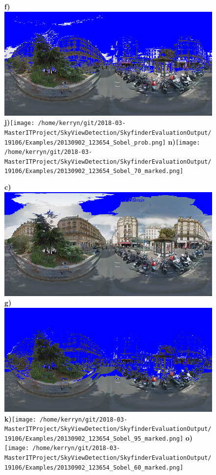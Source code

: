 \documentclass{article}
\begin{document}
\begin{figure}
\textbf{\scriptsize{f)}}\includegraphics[scale=0.13]{Images/2/panorama-JtVHmEl7WCiz1xJ0bcJpBg-1_Sobel_70_marked.png}%
\textbf{\scriptsize{j)}}\texttt{[image: /home/kerryn/git/2018-03-MasterITProject/SkyViewDetection/SkyfinderEvaluationOutput/19106/Examples/20130902\_123654\_Sobel\_prob.png]} %
\textbf{\scriptsize{n)}}\texttt{[image: /home/kerryn/git/2018-03-MasterITProject/SkyViewDetection/SkyfinderEvaluationOutput/19106/Examples/20130902\_123654\_Sobel\_70\_marked.png]} 

\textbf{\scriptsize{c)}}\includegraphics[scale=0.13]{Images/2/panorama-JtVHmEl7WCiz1xJ0bcJpBg-1_Sobel_95_marked.png} %
\textbf{\scriptsize{g)}}\includegraphics[scale=0.13]{Images/2/panorama-JtVHmEl7WCiz1xJ0bcJpBg-1_Sobel_60_marked.png}%
\textbf{\scriptsize{k)}}\texttt{[image: /home/kerryn/git/2018-03-MasterITProject/SkyViewDetection/SkyfinderEvaluationOutput/19106/Examples/20130902\_123654\_Sobel\_95\_marked.png]} %
\textbf{\scriptsize{o)}}\texttt{[image: /home/kerryn/git/2018-03-MasterITProject/SkyViewDetection/SkyfinderEvaluationOutput/19106/Examples/20130902\_123654\_Sobel\_60\_marked.png]} 


\end{figure}
\end{document}
